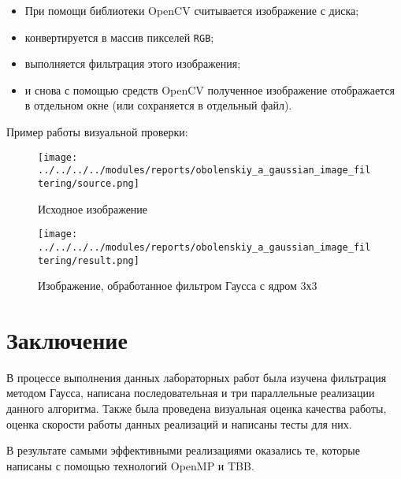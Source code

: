 \documentclass{report}
\begin{document}
    \begin{itemize}
        \item При помощи библиотеки OpenCV считывается изображение с диска;
        \item конвертируется в массив пикселей \verb|RGB|;
        \item выполняется фильтрация этого изображения;
        \item и снова с помощью средств OpenCV полученное изображение отображается в отдельном окне (или сохраняется в отдельный файл).
    \end{itemize}
    \par Пример работы визуальной проверки:
    \begin{figure}[htbp]
        \centering
        \texttt{[image: ../../../../modules/reports/obolenskiy\_a\_gaussian\_image\_filtering/source.png]}
        \caption{Исходное изображение}
    \end{figure}
    \begin{figure}[htbp]
        \centering
        \texttt{[image: ../../../../modules/reports/obolenskiy\_a\_gaussian\_image\_filtering/result.png]}
        \caption{Изображение, обработанное фильтром Гаусса с ядром 3х3}
    \end{figure}

    \newpage
    \section*{Заключение}

    \par В процессе выполнения данных лабораторных работ была изучена фильтрация методом Гаусса, написана последовательная и три параллельные реализации данного алгоритма. Также была проведена визуальная оценка качества работы, оценка скорости работы данных реализаций и написаны тесты для них.
    \par В результате самыми эффективными реализациями оказались те, которые написаны с помощью технологий OpenMP и TBB.

    \newpage
\end{document}
